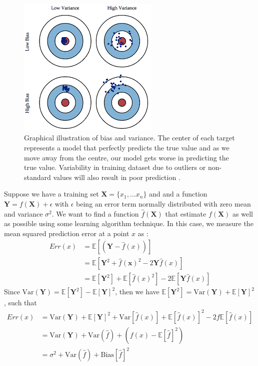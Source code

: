 \begin{figure}[H]
  \centering
    \includegraphics[width=0.6\textwidth]{images/Bias.png}
    \caption{Graphical illustration of bias and variance. The center of each target represents a model that perfectly predicts the true value and as we move away from the centre, our model gets worse in predicting the true value. Variability in training dataset due to outliers or non-standard values will also result in poor prediction \citep{fortmann2012understanding}.}
  \label{RC}
 \end{figure}
 
Suppose  we have a training set $\textbf{X}=\{x_1,\dots x_n\}$ and and a function $\textbf{Y}=f(\textbf{X})+\epsilon$ with $\epsilon$ being an error term normally distributed with zero mean and variance $\sigma^2$. We want to find a function $\widehat{f}(\textbf{X})$  that estimate $f(\textbf{X})$ as well as possible using some learning algorithm technique. In this case, we measure the mean squared prediction error at a point $x$ as :
\begin{align*}
Err(x)&= \mathbb{E}\left[(\textbf{Y}- \widehat{f}(x) ) \right]\\
&= \mathbb{E}\left[ \textbf{Y}^2 +\widehat{f}(\textbf{x})^2 -2\textbf{Y}\widehat{f}(x)\right]\\
&= \mathbb{E}\left[\textbf{Y}^2 \right] + \mathbb{E}\left[\widehat{f}(x)^2 \right]- 2\mathbb{E}\left[\textbf{Y}\widehat{f}(x)\right]
\end{align*}
Since $\text{Var}(\textbf{Y}) = \mathbb{E}\left[\textbf{Y}^2 \right]- \mathbb{E}\left[\textbf{Y}\right]^2$, then we have  $\mathbb{E}\left[\textbf{Y}^2 \right] =\text{Var}(\textbf{Y}) + \mathbb{E}\left[\textbf{Y}\right]^2$, such that
\begin{align*}
Err(x)&= \text{Var}(\textbf{Y}) + \mathbb{E}\left[\textbf{Y}\right]^2 + \text{Var}\left[\widehat{f}(x)\right] + \mathbb{E}\left[\widehat{f}(x) \right]^2- 2f\mathbb{E}\left[\widehat{f}(x) \right]\\
&= \text{Var}(\textbf{Y}) + \text{Var}(\widehat{f}) + (f(x)- \mathbb{E}\left[
\widehat{f}\right]^2)\\
&= \sigma^2 + \text{Var}(\widehat{f})+ \text{Bias}\left[\widehat{f}\right]^2
\end{align*}

